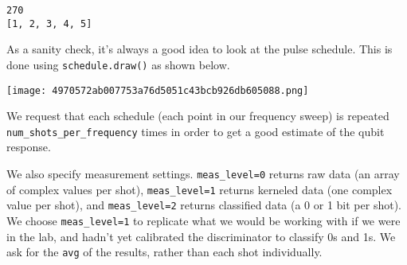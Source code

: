 \begin{Shaded}
\begin{Highlighting}[]

\OperatorTok{=}\NormalTok{ [}\NormalTok{,}\NormalTok{,}\NormalTok{,}\NormalTok{,}\NormalTok{]}
\OperatorTok{=}\NormalTok{ [sweep\_sched.assign\_parameters(\{freq: f\}, inplace}\OperatorTok{=}\NormalTok{) }\NormalTok{ frequencies\_Hz]}
\end{Highlighting}
\end{Shaded}

\begin{verbatim}
270
[1, 2, 3, 4, 5]
\end{verbatim}

\leavevmode{}%
As a sanity check, it's always a good idea to look at the pulse
schedule. This is done using \texttt{schedule.draw()} as shown below.

\hypertarget{40689979-3fa6-46b6-a7fd-b16b77dec2e7}{}
\begin{Shaded}
\begin{Highlighting}[]
\NormalTok{schedules[}\NormalTok{].draw(backend}\OperatorTok{=}
\NormalTok{schedules[}\NormalTok{].draw(backend}\OperatorTok{=}
\end{Highlighting}
\end{Shaded}

\texttt{[image: 4970572ab007753a76d5051c43bcb926db605088.png]}

\leavevmode{}%
We request that each schedule (each point in our frequency sweep) is
repeated \texttt{num\_shots\_per\_frequency} times in order to get a
good estimate of the qubit response.

We also specify measurement settings. \texttt{meas\_level=0} returns raw
data (an array of complex values per shot), \texttt{meas\_level=1}
returns kerneled data (one complex value per shot), and
\texttt{meas\_level=2} returns classified data (a 0 or 1 bit per shot).
We choose \texttt{meas\_level=1} to replicate what we would be working
with if we were in the lab, and hadn't yet calibrated the discriminator
to classify 0s and 1s. We ask for the
\texttt{\textquotesingle{}avg\textquotesingle{}} of the results, rather
than each shot individually.

